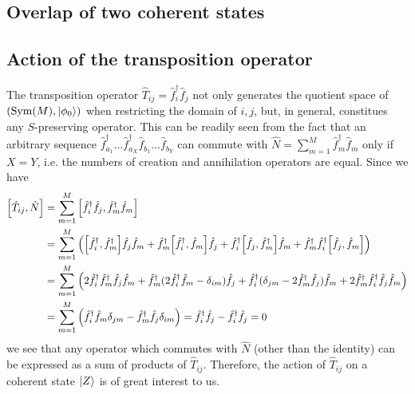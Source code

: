 \documentclass[12pt]{article}
\newcommand{\hc}{^\dagger}
\newcommand{\Sym}{\text{Sym}}
\begin{document}
	\subsection{Overlap of two coherent states}
	
	\subsection{Action of the transposition operator}
	
	The transposition operator $\hat{T}_{ij}=\hat{f}\hc_i\hat{f}_j$ not only generates the quotient space of $(\Sym(M), \ket{\phi_0})$ when restricting the domain of $i,j$, but, in general, constitues any $S$-preserving operator. This can be readily seen from the fact that an arbitrary sequence $\hat{f}\hc_{a_1}\dots\hat{f}\hc_{a_X}\hat{f}_{b_1}\dots\hat{f}_{b_Y}$ can commute with $\hat{N}=\sum_{m=1}^M\hat{f}\hc_m\hat{f}_m$ only if $X=Y$, i.e. the numbers of creation and annihilation operators are equal. Since we have
	\begin{align}\label{eq:transposition commutes with N}
	\comm{\hat{T}_{ij}}{\hat{N}}&=\sum_{m=1}^M\comm{\hat{f}\hc_i\hat{f}_j}{\hat{f}\hc_m\hat{f}_m}\nonumber\\
	&=\sum_{m=1}^M\left(\comm{\hat{f}\hc_i}{\hat{f}\hc_m}\hat{f}_j\hat{f}_m+\hat{f}\hc_m\comm{\hat{f}\hc_i}{\hat{f}_m}\hat{f}_j+\hat{f}\hc_i\comm{\hat{f}_j}{\hat{f}\hc_m}\hat{f}_m+\hat{f}\hc_m\hat{f}\hc_i\comm{\hat{f}_j}{\hat{f}_m}\right)\nonumber\\
	&=\sum_{m=1}^M\left(2\hat{f}\hc_i\hat{f}\hc_m\hat{f}_j\hat{f}_m+\hat{f}\hc_m(2\hat{f}\hc_i\hat{f}_m-\delta_{im})\hat{f}_j+\hat{f}\hc_i(\delta_{jm}-2\hat{f}\hc_m\hat{f}_j)\hat{f}_m+2\hat{f}\hc_m\hat{f}\hc_i\hat{f}_j\hat{f}_m\right)\nonumber\\
	&=\sum_{m=1}^M\left(\hat{f}\hc_i\hat{f}_m\delta_{jm}-\hat{f}\hc_m\hat{f}_j\delta_{im}\right)=\hat{f}\hc_i\hat{f}_j-\hat{f}\hc_i\hat{f}_j=0
	\end{align}
	we see that any operator which commutes with $\hat{N}$ (other than the identity) can be expressed as a sum of products of $\hat{T}_{ij}$. Therefore, the action of $\hat{T}_{ij}$ on a coherent state $\ket{Z}$ is of great interest to us.
	
\end{document}
